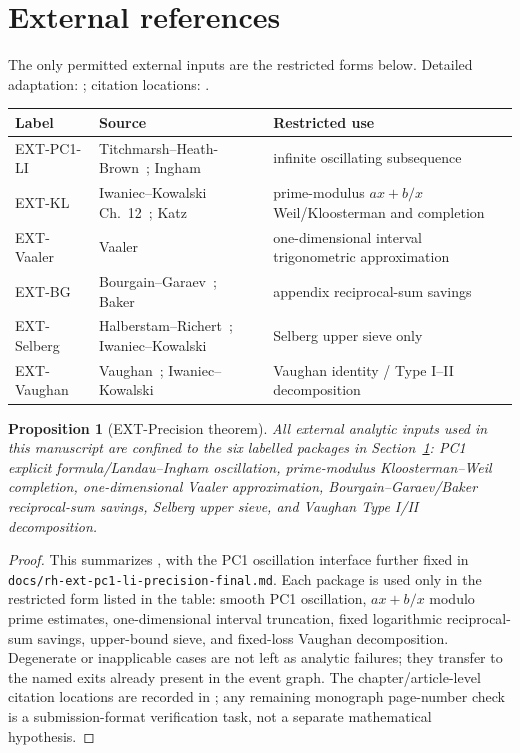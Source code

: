 \documentclass[11pt]{article}
\newtheorem{proposition}[theorem]{Proposition}
\theoremstyle{definition}
\begin{document}
\section{External references}\label{sec:external}
The only permitted external inputs are the restricted forms below.  Detailed adaptation: ; citation locations: .
\begin{longtable}{@{}L{0.16\textwidth}L{0.34\textwidth}L{0.42\textwidth}@{}}
\toprule
Label & Source & Restricted use\\
\midrule
EXT-PC1-LI & Titchmarsh--Heath-Brown~\cite{Titchmarsh1986}; Ingham~\cite{Ingham1932} & infinite oscillating subsequence\\
EXT-KL & Iwaniec--Kowalski Ch.~12~\cite{IwaniecKowalski2004}; Katz~\cite{Katz1988} & prime-modulus $ax+b/x$ Weil/Kloosterman and completion\\
EXT-Vaaler & Vaaler~\cite{Vaaler1985} & one-dimensional interval trigonometric approximation\\
EXT-BG & Bourgain--Garaev~\cite{BourgainGaraev2012}; Baker~\cite{Baker2012} & appendix reciprocal-sum savings\\
EXT-Selberg & Halberstam--Richert~\cite{HalberstamRichert1974}; Iwaniec--Kowalski~\cite{IwaniecKowalski2004} & Selberg upper sieve only\\
EXT-Vaughan & Vaughan~\cite{Vaughan1977}; Iwaniec--Kowalski~\cite{IwaniecKowalski2004} & Vaughan identity / Type I--II decomposition\\
\bottomrule
\end{longtable}


\begin{proposition}[EXT-Precision theorem]
All external analytic inputs used in this manuscript are confined to the six labelled packages in Section~\ref{sec:external}: PC1 explicit formula/Landau--Ingham oscillation, prime-modulus Kloosterman--Weil completion, one-dimensional Vaaler approximation, Bourgain--Garaev/Baker reciprocal-sum savings, Selberg upper sieve, and Vaughan Type I/II decomposition.
\end{proposition}
\begin{proof}
This summarizes , with the PC1 oscillation interface further fixed in \texttt{docs/rh-ext-pc1-li-precision-final.md}.  Each package is used only in the restricted form listed in the table: smooth PC1 oscillation, $ax+b/x$ modulo prime estimates, one-dimensional interval truncation, fixed logarithmic reciprocal-sum savings, upper-bound sieve, and fixed-loss Vaughan decomposition.  Degenerate or inapplicable cases are not left as analytic failures; they transfer to the named exits already present in the event graph.  The chapter/article-level citation locations are recorded in ; any remaining monograph page-number check is a submission-format verification task, not a separate mathematical hypothesis.
\end{proof}
\end{document}
